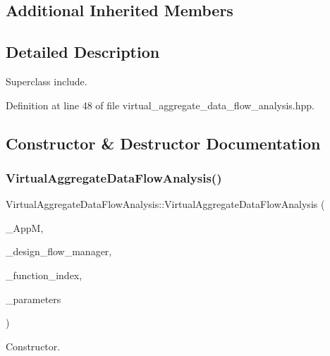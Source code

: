 \subsection*{Additional Inherited Members}


\subsection{Detailed Description}
Superclass include. 

Definition at line 48 of file virtual\+\_\+aggregate\+\_\+data\+\_\+flow\+\_\+analysis.\+hpp.



\subsection{Constructor \& Destructor Documentation}
\mbox{\label{classVirtualAggregateDataFlowAnalysis_a70ff2a8ecb41e161c60b1016d65543e7}} 
\subsubsection{\texorpdfstring{Virtual\+Aggregate\+Data\+Flow\+Analysis()}{VirtualAggregateDataFlowAnalysis()}}
{\footnotesize\ttfamily Virtual\+Aggregate\+Data\+Flow\+Analysis\+::\+Virtual\+Aggregate\+Data\+Flow\+Analysis (\begin{DoxyParamCaption}\item[{const \hyperlink{application__manager_8hpp_a04ccad4e5ee401e8934306672082c180}{application\+\_\+manager\+Ref}}]{\+\_\+\+AppM,  }\item[{const Design\+Flow\+Manager\+Const\+Ref}]{\+\_\+design\+\_\+flow\+\_\+manager,  }\item[{const unsigned int}]{\+\_\+function\+\_\+index,  }\item[{const \hyperlink{Parameter_8hpp_a37841774a6fcb479b597fdf8955eb4ea}{Parameter\+Const\+Ref}}]{\+\_\+parameters }\end{DoxyParamCaption})}



Constructor. 

